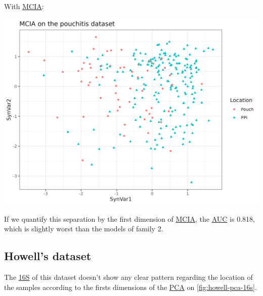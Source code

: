 \documentclass[
  12pt,
  a4paper,
  twoside,
  openright]{book}
\let\origfigure\figure
\let\endorigfigure\endfigure
\renewenvironment{figure}[1][2] {
    \expandafter\origfigure\expandafter[!htbp]
} {
    \endorigfigure
}
\begin{document}
With \protect\hyperlink{acronyms_MCIA}{MCIA}:

\begin{figure}
\includegraphics[width=1\linewidth]{images/morgan-mcia} \caption[MCIA dimensions in the Morgan's dataset.]{MCIA dimensions in the Morgan's dataset. MCIA first two dimensions of the dataset shows some separation between samples by location. Each point represents a sample (colored and shaped by location).}\label{fig:morgan-mcia-plot}
\end{figure}

If we quantify this separation by the first dimension of \protect\hyperlink{acronyms_MCIA}{MCIA}, the \protect\hyperlink{acronyms_AUC}{AUC} is 0.818, which is slightly worst than the models of family 2.

\FloatBarrier

\hypertarget{results-howell}{%
\subsection{Howell's dataset}\label{results-howell}}

The \protect\hyperlink{acronyms_16S}{16S} of this dataset doesn't show any clear pattern regarding the location of the samples according to the firsts dimensions of the \protect\hyperlink{acronyms_PCA}{PCA} on \ref{fig:howell-pca-16s}.
\end{document}
